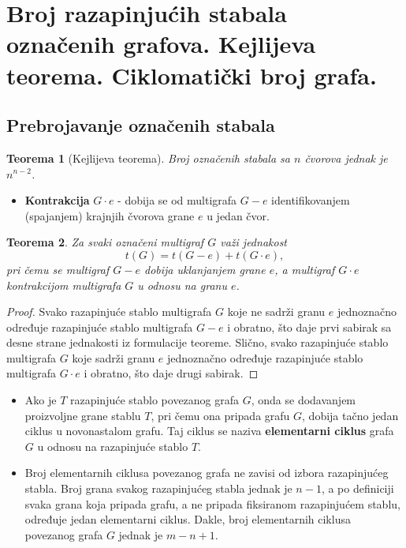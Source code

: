 \documentclass[a4paper,12pt]{article}
\numberwithin{algorithm}{section}
\theoremstyle{plain}
\newtheorem{theorem}{Teorema}[section]
\theoremstyle{definition}
\theoremstyle{remark}
\begin{document}
\newpage
\section{Broj razapinjućih stabala označenih grafova. Kejlijeva teorema. Ciklomatički broj grafa.}
\subsection{Prebrojavanje označenih stabala}
\begin{theorem}[Kejlijeva teorema]
    Broj označenih stabala sa $n$ čvorova jednak je $n^{n-2}$.
\end{theorem}

\begin{itemize}
    \item \textbf{Kontrakcija} $G \cdot e$ - dobija se od multigrafa $G-e$ identifikovanjem (spajanjem) krajnjih čvorova grane $e$ u jedan čvor.
\end{itemize}
\begin{theorem}
    Za svaki označeni multigraf $G$ važi jednakost
    \[ t(G) = t(G - e) + t(G \cdot e), \]
    pri čemu se multigraf $G - e$ dobija uklanjanjem grane $e$, a multigraf $G \cdot e$ kontrakcijom multigrafa $G$ u odnosu na granu $e$.
\end{theorem}

\begin{proof}
    Svako razapinjuće stablo multigrafa $G$ koje ne sadrži granu $e$ jednoznačno određuje razapinjuće stablo multigrafa $G - e$ i obratno, što daje prvi sabirak sa desne strane jednakosti iz formulacije teoreme. Slično, svako razapinjuće stablo multigrafa $G$ koje sadrži granu $e$ jednoznačno određuje razapinjuće stablo multigrafa $G \cdot e$ i obratno, što daje drugi sabirak.
\end{proof}
\begin{itemize}
    \item Ako je $T$ razapinjuće stablo povezanog grafa $G$, onda se dodavanjem proizvoljne grane stablu $T$, pri čemu ona pripada grafu $G$, dobija tačno jedan ciklus u novonastalom grafu. Taj ciklus se naziva \textbf{elementarni ciklus} grafa $G$ u odnosu na razapinjuće stablo $T$.
    \item Broj elementarnih ciklusa povezanog grafa ne zavisi od izbora razapinjućeg stabla. Broj grana svakog razapinjućeg stabla jednak je $n - 1$, a po definiciji svaka grana koja pripada grafu, a ne pripada fiksiranom razapinjućem stablu, određuje jedan elementarni ciklus. Dakle, broj elementarnih ciklusa povezanog grafa $G$ jednak je $m - n + 1$.
\end{itemize}
\end{document}
